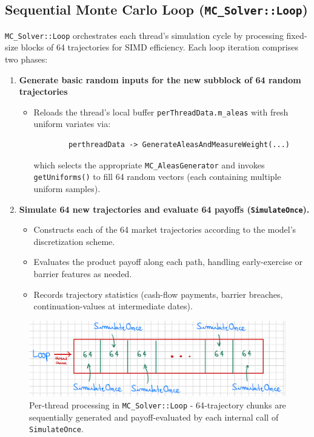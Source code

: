 \documentclass[11pt]{article}
\begin{document}
\subsection{Sequential Monte Carlo Loop (\texttt{MC\_Solver::Loop})}

\texttt{MC\_Solver::Loop} orchestrates each thread’s simulation cycle by processing fixed‐size blocks of 64 trajectories for SIMD efficiency.  Each loop iteration comprises two phases:

\begin{enumerate}
  \item \textbf{Generate basic random inputs for the new subblock of 64 random trajectories}
    \begin{itemize}
        \item Reloads the thread’s local buffer \texttt{perThreadData.m\_aleas} with fresh uniform variates via:
        \begin{verbatim}
        perthreadData -> GenerateAleasAndMeasureWeight(...)
        \end{verbatim}
       which selects the appropriate \texttt{MC\_AleasGenerator} and invokes  
    \texttt{getUniforms()} to fill 64 random vectors (each containing multiple uniform samples).
    \end{itemize}
      

  \item \textbf{Simulate 64 new trajectories and evaluate 64 payoffs (\texttt{SimulateOnce}).}
    \begin{itemize}
      \item Constructs each of the 64 market trajectories according to the model’s discretization scheme.
      \item Evaluates the product payoff along each path, handling early-exercise or barrier features as needed.
      \item Records trajectory statistics (cash-flow payments, barrier breaches, continuation-values at intermediate dates).
    \end{itemize}
\end{enumerate}

\begin{figure}[h]
  \centering
  \includegraphics[width=\textwidth]{LoopScheme.png}
  \caption{Per‐thread processing in \texttt{MC\_Solver::Loop} - 64‐trajectory chunks are sequentially generated and payoff-evaluated by each internal call of \texttt{SimulateOnce}.}
\end{figure}
\end{document}
